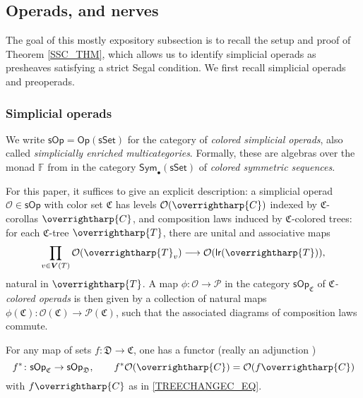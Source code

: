 \documentclass[a4paper,10pt
,draft
]{article}%
\numberwithin{equation}{section}
\numberwithin{figure}{section}
\theoremstyle{definition} %
\newcommand{\longto}{\longrightarrow}%
\newcommand{\vect}[1]{\text{\overrightharp{\ensuremath{#1}}}}
\newcommand{\Sym}{\ensuremath{\mathsf{Sym}}}%
\newcommand{\sSet}{\ensuremath{\mathsf{sSet}}}%
\newcommand{\Op}{\mathsf{Op}}%
\newcommand{\sOp}{\ensuremath{\mathsf{sOp}}}%
\renewcommand{\O}{\ensuremath{\mathcal O}}
\renewcommand{\P}{\ensuremath{\mathcal P}}
\newcommand{\1}{\ensuremath{\mathbbm 1}}%
\begin{document}
\subsection{Operads, and nerves}
\label{NERVE_SEC}

The goal of this mostly expository subsection is to recall the setup and proof of Theorem \ref{SSC_THM},
which allows us to identify simplicial operads as presheaves satisfying a strict Segal condition.
We first recall simplicial operads and preoperads.


\subsubsection*{Simplicial operads}

We write $\sOp = \Op(\sSet)$ for the category of \textit{colored simplicial operads}, also called \textit{simplicially enriched multicategories}.
Formally, these are 
algebras over the monad $\mathbb F$ from \cite[Def. \ref{OC-FREEOP DEF}]{BP_FCOP}
in the category $\Sym_\bullet(\sSet)$ of \textit{colored symmetric sequences}.

For this paper, it suffices to give  an explicit description:
a simplicial operad $\O \in \sOp$ with color set $\mathfrak C$
has levels $\O(\vect C)$ indexed by
$\mathfrak C$-corollas $\vect C$, %
and composition laws induced by $\mathfrak C$-colored trees:
for each $\mathfrak C$-tree $\vect T$,
there are unital and associative maps
\[
        \prod_{v \in \boldsymbol{V}(T)}\O(\vect T_v) \longto \O(\mathsf{lr}(\vect T)),
\]
natural in $\vect T$.
A map
$\phi \colon \O \to \P$
in the category $\sOp_{\mathfrak C}$ of \textit{$\mathfrak C$-colored operads}
is then given by a collection of natural maps
$\phi(\mathfrak C) \colon \O(\mathfrak C) \to \P(\mathfrak C)$,
such that the associated diagrams of composition laws commute.

For any map of sets $f \colon \mathfrak D \to \mathfrak C$,
one has a functor (really an adjunction \cite[Rem. \ref{OC-OP_MAP REM}]{BP_FCOP})
\[
        f^{\**} \colon \sOp_{\mathfrak C} \to \sOp_{\mathfrak D},
        \qquad
        f^{\**}\O(\vect C) = \O(f \vect C)
\]
with $f \vect C$ as in \eqref{TREECHANGEC_EQ}.
\end{document}
